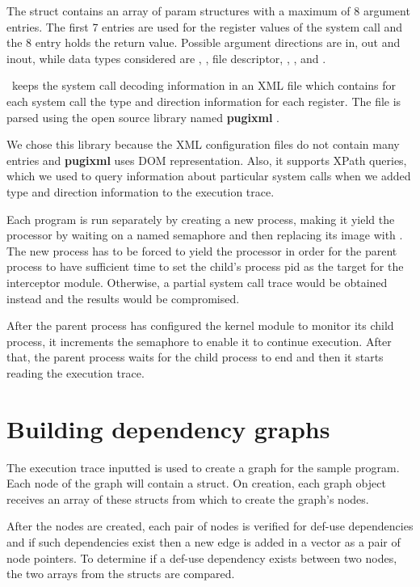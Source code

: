 The  struct contains an array of param structures with a maximum of 8 argument entries. The first 7 entries are used for the register values of the system call and the 8 entry holds the return value. Possible argument directions are  in, out and inout, while data types considered are , , file descriptor, , ,  and .

\project\ keeps the system call decoding information in an XML file which contains for each system call the type and direction information for each register. The file is parsed using the open source library named \textbf{pugixml} \cite{pugixml-library}. 

We chose this library because the XML configuration files do not contain many entries and \textbf{pugixml} uses DOM representation. Also, it supports XPath queries, which we used to query information about particular system calls when we added type and direction information to the execution trace.


Each program is run separately by creating a new process, making it yield the processor by waiting on a named semaphore and then replacing its image with . The new process has to be forced to yield the processor in order for the parent process to have sufficient time to set the child’s process pid as the target for the interceptor module. Otherwise, a partial system call trace would be obtained instead and the results would be compromised. 

After the parent process has configured the kernel module to monitor its child process, it increments the semaphore to enable it to continue execution. After that, the parent process waits for the child process to end and then it starts reading the execution trace.

\section{Building dependency graphs}
\label{fourth:dep-graphs}

The execution trace inputted is used to create a graph for the sample program. Each node of the graph will contain a  struct. On creation, each graph object receives an array of these structs from which to create the graph’s nodes.

After the nodes are created, each pair of nodes is verified for def-use dependencies and if such dependencies exist then a new edge is added in a vector as a pair of node pointers. To determine if a def-use dependency exists between two nodes, the two  arrays from the  structs are compared.

